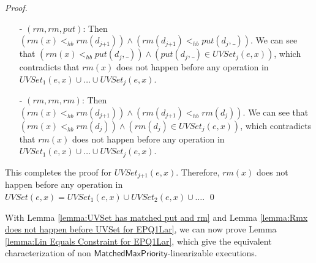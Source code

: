 \begin {proof}
\begin{itemize}
\begin{itemize}
    \item[-] If $\textit{put}(d_{\textit{ind}},\_) <_{hb} \textit{rm}(d_{\textit{ind-1}})$, then we obtain $T_{\textit{ind-1}}$, which already contain contradiction.
    \end{itemize}

    By base case $1$, base case $2$ and the induction step, it is easy to see that for each $i$, $T_i$ contains contradiction. Therefore, $T_j$, the case of $(\textit{rm},\textit{put},\textit{rm})$, contains contradiction.

\item[-] $(\textit{rm},\textit{rm},\textit{put})$: Then $( \textit{rm}(x) <_{hb} \textit{rm}(d_{\textit{j+1}}) ) \wedge ( \textit{rm}(d_{\textit{j+1}}) <_{hb} \textit{put}(d_j,\_) )$. We can see that $( \textit{rm}(x) <_{hb} \textit{put}(d_j,\_) ) \wedge ( \textit{put}(d_j,\_) \in \textit{UVSet}_j(e,x) )$, which contradicts that $\textit{rm}(x)$ does not happen before any operation in $\textit{UVSet}_1(e,x) \cup \ldots \cup \textit{UVSet}_j(e,x)$.

\item[-] $(\textit{rm},\textit{rm},\textit{rm})$: Then $( \textit{rm}(x) <_{hb} \textit{rm}(d_{\textit{j+1}}) ) \wedge ( \textit{rm}(d_{\textit{j+1}}) <_{hb} \textit{rm}(d_j) )$. We can see that $( \textit{rm}(x) <_{hb} \textit{rm}(d_j) ) \wedge ( \textit{rm}(d_j) \in \textit{UVSet}_j(e,x) )$, which contradicts that $\textit{rm}(x)$ does not happen before any operation in $\textit{UVSet}_1(e,x) \cup \ldots \cup \textit{UVSet}_j(e,x)$.
\end{itemize}

This completes the proof for $\textit{UVSet}_{\textit{j+1}}(e,x)$. Therefore, $\textit{rm}(x)$ does not happen before any operation in $\textit{UVSet}(e,x) = \textit{UVSet}_1(e,x) \cup \textit{UVSet}_2(e,x) \cup \ldots$. \qed
\end {proof}

With Lemma \ref{lemma:UVSet has matched put and rm} and Lemma \ref{lemma:Rmx does not happen before UVSet for EPQ1Lar}, we can now prove Lemma \ref{lemma:Lin Equals Constraint for EPQ1Lar}, which give the equivalent characterization of non $\mathsf{MatchedMaxPriority}$-linearizable executions.




